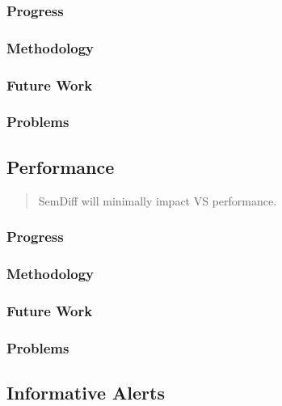 \documentclass[draftclsnofoot,onecolumn]{IEEEtran}
\begin{document}
\subsubsection{Progress}

\subsubsection{Methodology}

\subsubsection{Future Work}

\subsubsection{Problems}






\subsection{Performance}

\begin{quote}

SemDiff will minimally impact VS performance.

\end{quote}

\subsubsection{Progress}

\subsubsection{Methodology}

\subsubsection{Future Work}

\subsubsection{Problems}






\subsection{Informative Alerts}
\end{document}
